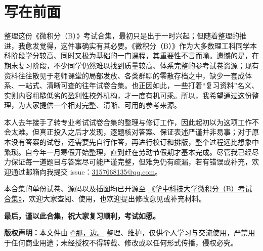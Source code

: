 \documentclass[../main.tex]{subfiles}
\begin{document}
\chapter*{写在前面}

整理这份《微积分（B）》考试合集，最初只是出于一时兴起；但随着整理的推进，我愈发觉得，这件事确实有其必要。《微积分（B）》作为大多数理工科同学本科阶段学分较高、同时又极为基础的一门课程，其重要性不言而喻。遗憾的是，在期末复习阶段，不少同学仍然难以找到质量较高、体系完整的参考试卷资源；现有资料往往散见于老师课堂的局部发放、各类群聊的零散存档之中，缺少一套成体系、一站式、清晰可查的往年试卷合集。也正因如此，一些打着“复习资料”名义、实则内容粗糙低劣的盈利性校外机构，才一度有机可乘。所以，我希望通过这份整理，为大家提供一个相对完整、清晰、可用的参考来源。

本人去年接手了转专业考试试卷合集的整理与修订工作，因此起初以为这项工作不会太难。但真正投入之后才发现，逐题核对答案、保证表述严谨并非易事；对于原本没有答案的试卷，还需要先自行作答，再进行校订和排版，整个过程远比想象中繁琐。自今年一月寒假开始整理，直到赶在劳动节假期才基本完成。尽管我已经尽力保证每一道题目与答案尽可能严谨完整，但难免仍有疏漏，若有错误或补充，欢迎通过邮箱向我提交 issue：\href{mailto:3157668135@qq.com}{3157668135@qq.com}。

本合集的单份试卷、源码以及插图均已开源至 \href{https://github.com/Na-Bian/Collection-of-Calculus-Exams}{《华中科技大学微积分（B）考试合集》}，欢迎大家查阅、使用，也欢迎提出修改意见或补充材料。

\vspace{0.5em}

\begin{center}
    {\Large\textbf{最后，谨以此合集，祝大家复习顺利，考试如愿。}}
\end{center}

\vspace{0.5em}

\noindent\textbf{版权声明：}本文件由 \href{mailto:3157668135@qq.com}{@那，边。} 整理、维护，仅供个人学习与交流使用，严禁用于任何商业用途；未经授权不得转载、修改或以任何形式传播，侵权必究。
\end{document}
